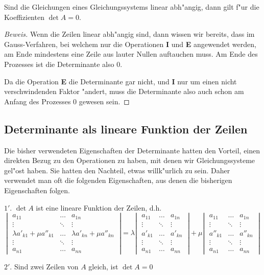 \begin{hilfssatz}
\label{detlinabh}
Sind die Gleichungen eines Gleichungssystems linear abh"angig, dann
gilt f"ur die Koeffizienten $\det A=0$.
\end{hilfssatz}
\begin{proof}[Beweis]
Wenn die Zeilen linear abh"angig sind, dann wissen wir bereits, dass
im Gauss-Verfahren, bei welchem nur die Operationen {\bf I} und {\bf E}
angewendet werden, am Ende mindestens eine Zeile aus lauter
Nullen auftauchen muss.
Am Ende des Prozesses ist die Determinante also $0$.

Da die Operation {\bf E} die Determinante gar nicht,
und {\bf I} nur um einen nicht verschwindenden Faktor "andert, muss
die Determinante also auch schon am Anfang des Prozesses $0$ gewesen
sein.
\end{proof}

\subsection{Determinante als lineare Funktion der Zeilen\label{detlinfun}}
Die bisher verwendeten Eigenschaften der Determinante hatten den
Vorteil, einen direkten Bezug zu den Operationen zu haben, mit 
denen wir Gleichungssysteme gel"ost haben.
Sie hatten den Nachteil, etwas willk"urlich zu sein.
Daher verwendet man oft die folgenden Eigenschaften, aus denen
die bisherigen Eigenschaften folgen.

\begin{compactenum}
\item[$1'$.] $\det A$ ist eine lineare Funktion der Zeilen, d.h.
\[
\left|
\;
\begin{matrix}
a_{11}&\dots&a_{1n}\\
\vdots&\ddots&\vdots\\
\lambda a'_{k1}+\mu a''_{k1}&\dots&\lambda a'_{kn}+\mu a''_{kn}\\
\vdots&\ddots&\vdots\\
a_{n1}&\dots&a_{nn}
\end{matrix}
\;
\right|
=
\lambda
\left|
\;
\begin{matrix}
a_{11}&\dots&a_{1n}\\
\vdots&\ddots&\vdots\\
a'_{k1}&\dots&a'_{kn}\\
\vdots&\ddots&\vdots\\
a_{n1}&\dots&a_{nn}
\end{matrix}
\;
\right|
+
\mu
\left|
\;
\begin{matrix}
a_{11}&\dots&a_{1n}\\
\vdots&\ddots&\vdots\\
a''_{k1}&\dots&a''_{kn}\\
\vdots&\ddots&\vdots\\
a_{n1}&\dots&a_{nn}
\end{matrix}
\;
\right|
\]
\item[$2'$.] Sind zwei Zeilen von $A$ gleich, ist $\det A=0$
\end{compactenum}

